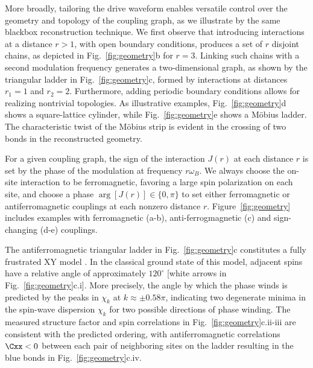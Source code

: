 \documentclass[aps,pra,twocolumn,superscriptaddress]{revtex4-1} %
\begin{document}
\begin{bibunit}
More broadly, tailoring the drive waveform enables versatile control over the geometry and topology of the coupling graph, as we illustrate by the same blackbox reconstruction technique.  We first observe that introducing interactions at a distance $r>1$, with open boundary conditions, produces a set of $r$ disjoint chains, as depicted in Fig.~\ref{fig:geometry}b for $r=3$.  Linking such chains with a second modulation frequency generates a two-dimensional graph, as shown by the triangular ladder in Fig.~\ref{fig:geometry}c, formed by interactions at distances $r_1=1$ and $r_2 = 2$.  Furthermore, adding periodic boundary conditions allows for realizing nontrivial topologies.  As illustrative examples, Fig.~\ref{fig:geometry}d shows a square-lattice cylinder, while Fig.~\ref{fig:geometry}e shows a M\"{o}bius ladder.  The characteristic twist of the M\"obius strip is evident in the crossing of two bonds in the reconstructed geometry.

For a given coupling graph, the sign of the interaction $J(r)$ at each distance $r$ is set by the phase of the modulation at frequency $r\omega_B$.  We always choose the on-site interaction to be ferromagnetic, favoring a large spin polarization on each site, and choose a phase $\arg[J(r)] \in\{0,\pi\}$ to set either ferromagnetic or antiferromagnetic couplings at each nonzero distance $r$.  Figure~\ref{fig:geometry} includes examples with ferromagnetic (a-b), anti-ferrogmagnetic (c) and sign-changing (d-e) couplings.

The antiferromagnetic triangular ladder in Fig.~\ref{fig:geometry}c constitutes a fully frustrated XY model \cite{lee1998phase}.  In the classical ground state of this model, adjacent spins have a relative angle of approximately $120^\circ$ [white arrows in Fig.~\ref{fig:geometry}c.i].  More precisely, the angle by which the phase winds is predicted by the peaks in $\chi_k$ at $k\approx \pm 0.58\pi$, indicating two degenerate minima in the spin-wave dispersion $\chi_k$ for two possible directions of phase winding.  The measured structure factor and spin correlations in Fig.~\ref{fig:geometry}c.ii-iii are consistent with the predicted ordering, with antiferromagnetic correlations $\Cxx < 0$ between each pair of neighboring sites on the ladder resulting in the blue bonds in Fig.~\ref{fig:geometry}c.iv. 


\end{bibunit}
\end{document}
